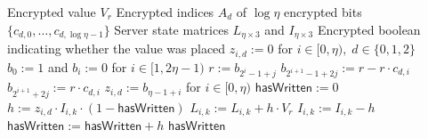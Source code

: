 \begin{algorithm}[ht!]
\caption{$\mathsf{HomPlacing}^*$ for the choice of three slots~\cite{cryptoeprint:2025/860}}
\label{alg:spar:homplacing}
\begin{algorithmic}[1]
    \Require Encrypted value $V_r$
    \Require Encrypted indices $A_d$ of $\log\eta$ encrypted bits $\{c_{d,0}, \dots, c_{d,\log\eta - 1}\}$
    \Require Server state matrices $L_{\eta\times3}$ and $I_{\eta\times3}$
    \Ensure Encrypted boolean indicating whether the value was placed
    \State $z_{i,d} := 0$ for $i \in [0, \eta),\; d \in \{0, 1, 2\}$
        \State $b_0 := 1$ and $b_i := 0$ for $i \in [1, 2\eta - 1)$
        \For{$i \gets [0, \log\eta)$}
            \For{$j \gets [0, 2^i)$}
                \State $r := b_{2^i - 1 + j}$
                \State $b_{2^{i+1} - 1 + 2j} := r - r\cdot c_{d,i}$
                \State $b_{2^{i+1} + 2j} := r\cdot c_{d,i}$
            \EndFor
        \EndFor
        \State $z_{i,d} := b_{\eta - 1 + i}$ for $i \in [0, \eta)$
    \EndFor
    \State $\mathsf{hasWritten} := 0$
            \For{$i \gets [0, \eta)$}
                \State $h := z_{i,d}\cdot I_{i,k}\cdot(1 - \mathsf{hasWritten})$
                \State $L_{i,k} := L_{i,k} + h\cdot V_r$
                \State $I_{i,k} := I_{i,k} - h$
                \State $\mathsf{hasWritten} := \mathsf{hasWritten} + h$
            \EndFor
        \EndFor
    \EndFor
    \State\Return $\mathsf{hasWritten}$
\end{algorithmic}
\end{algorithm}
